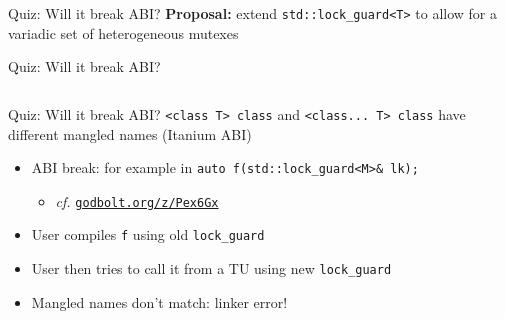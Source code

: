 \begin{frame}{Quiz: Will it break ABI?}
    \textbf{Proposal:} extend \texttt{std::lock\_guard<T>} to allow for a variadic set of heterogeneous mutexes

    \vspace*{5mm}

    \centering


    \scalebox{2}{$\downarrow$}

\end{frame}

\begin{frame}[fragile]{Quiz: Will it break ABI?}
    \begin{columns}[t]
        \begin{column}{.4\textwidth}
        \end{column}
        \begin{column}{.5\textwidth}
        \end{column}
    \end{columns}
\end{frame}

\begin{frame}[fragile]{Quiz: Will it break ABI?}
    \texttt{<class T> class} and \texttt{<class... T> class} have different mangled names (Itanium ABI)
    \begin{itemize}
        \item \textcolor{vertexDarkRed}{ABI break:} for example in \texttt{auto f(std::lock\_guard<M>\& lk);}
        \begin{itemize}
            \item \textit{cf.} \href{https://godbolt.org/z/Pex6Gx}{\texttt{godbolt.org/z/Pex6Gx}}
        \end{itemize}
        \item User compiles \texttt{f} using old \texttt{lock\_guard}
        \item User then tries to call it from a TU using new \texttt{lock\_guard}
        \item Mangled names don't match: linker error!
    \end{itemize}
\end{frame}

